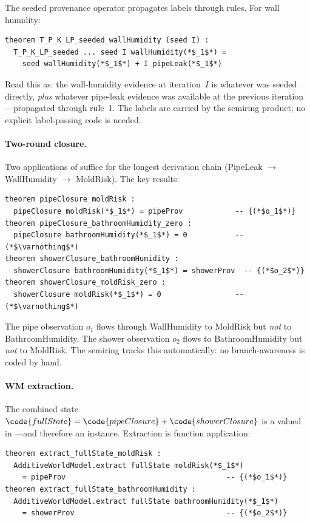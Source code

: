 \documentclass[11pt,openany]{report}
\begin{document}
\noindent
The seeded provenance operator 
propagates labels through rules.  For wall humidity:

\begin{lstlisting}[language={}]
theorem T_P_K_LP_seeded_wallHumidity (seed I) :
  T_P_K_LP_seeded ... seed I wallHumidity(*$_1$*) =
    seed wallHumidity(*$_1$*) + I pipeLeak(*$_1$*)
\end{lstlisting}

\noindent
Read this as: the wall-humidity evidence at iteration~$I$ is
whatever was seeded directly, \emph{plus} whatever pipe-leak
evidence was available at the previous iteration---propagated
through rule~1.  The labels are carried by the semiring product;
no explicit label-passing code is needed.

\paragraph{Two-round closure.}
Two applications of  suffice for the
longest derivation chain (PipeLeak $\to$ WallHumidity $\to$
MoldRisk).  The key results:

\begin{lstlisting}[language={}]
theorem pipeClosure_moldRisk :
  pipeClosure moldRisk(*$_1$*) = pipeProv            -- {(*$o_1$*)}
theorem pipeClosure_bathroomHumidity_zero :
  pipeClosure bathroomHumidity(*$_1$*) = 0           -- (*$\varnothing$*)
theorem showerClosure_bathroomHumidity :
  showerClosure bathroomHumidity(*$_1$*) = showerProv  -- {(*$o_2$*)}
theorem showerClosure_moldRisk_zero :
  showerClosure moldRisk(*$_1$*) = 0                 -- (*$\varnothing$*)
\end{lstlisting}

\noindent
The pipe observation $o_1$ flows through WallHumidity to MoldRisk
but \emph{not} to BathroomHumidity.  The shower observation $o_2$
flows to BathroomHumidity but \emph{not} to MoldRisk.  The
 semiring tracks this automatically: no
branch-awareness is coded by hand.

\paragraph{WM extraction.}
The combined state
$\code{fullState} = \code{pipeClosure} + \code{showerClosure}$
is a  valued in ---and therefore an
 instance.  Extraction is function
application:

\begin{lstlisting}[language={}]
theorem extract_fullState_moldRisk :
  AdditiveWorldModel.extract fullState moldRisk(*$_1$*)
    = pipeProv                                     -- {(*$o_1$*)}
theorem extract_fullState_bathroomHumidity :
  AdditiveWorldModel.extract fullState bathroomHumidity(*$_1$*)
    = showerProv                                   -- {(*$o_2$*)}
\end{lstlisting}
\end{document}
